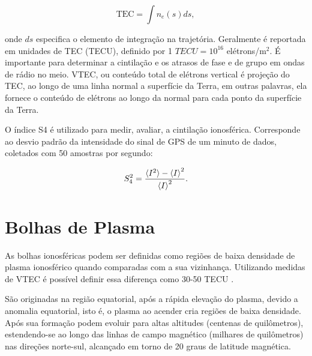 \begin{equation}
    \mbox{TEC}=\int{n_{e}(s)}ds\mbox{,}~
\end{equation}

onde $ds$ especifica o elemento de integração na trajetória. Geralmente é reportada em unidades de TEC (TECU), definido por 1 $TECU=10^{16}$ elétrons/m$^2$. É importante para determinar a cintilação e os atrasos de fase e de grupo em ondas de rádio no meio. VTEC, ou conteúdo total de elétrons vertical é projeção do TEC, ao longo de uma linha normal a superfície da Terra, em outras palavras, ela fornece o conteúdo de elétrons ao longo da normal para cada ponto da superfície da Terra.

O índice S4 é utilizado para medir, avaliar, a cintilação ionosférica. Corresponde ao desvio padrão da intensidade do sinal de GPS de um minuto de dados, coletados com 50 amostras por segundo:

\begin{equation}
    S_4^2=\frac{\braket{I^2}-\braket{I}^2}{\braket{I}^2}\mbox{.}
\end{equation}

\section{Bolhas de Plasma}

As bolhas ionosféricas podem ser definidas como regiões de baixa densidade de plasma ionosférico quando comparadas com a sua vizinhança. Utilizando medidas de VTEC é possível definir essa diferença como 30-50 TECU \cite{TAKAHASHI:2006}.

São originadas na região equatorial, após a rápida elevação do plasma, devido a anomalia equatorial, isto é, o plasma ao acender cria regiões de baixa densidade. Após sua formação podem evoluir para altas altitudes (centenas de quilômetros), estendendo-se ao longo das linhas de campo magnético (milhares de quilômetros) nas direções norte-sul, alcançado em torno de 20 graus de latitude magnética.
